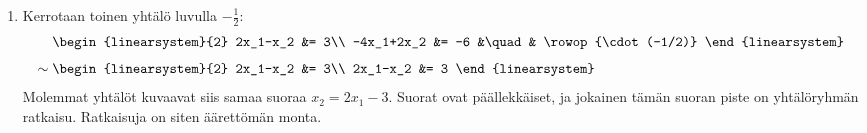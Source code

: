 \documentclass[11pt,a4paper]{amsart}
\begin{document}
\begin{solution}
  \leavevmode\par
\begin{enumerate}[label=\alph*), nosep]
  \item Kerrotaan toinen yhtälö luvulla \(-\frac12\):
    \[
      \begin{aligned}
        &
        \begin{linearsystem}{2}
          2x_1-x_2 &= 3\\
          -4x_1+2x_2 &= -6 &\quad& \rowop{\cdot(-1/2)}
        \end{linearsystem}\\[1ex]
        \sim{}&
        \begin{linearsystem}{2}
          2x_1-x_2 &= 3\\
          2x_1-x_2 &= 3
        \end{linearsystem}
      \end{aligned}
    \]
    Molemmat yhtälöt kuvaavat siis samaa suoraa \(x_2 = 2x_1 - 3\).
    Suorat ovat päällekkäiset, ja jokainen tämän suoran piste on
    yhtälöryhmän ratkaisu. Ratkaisuja on siten äärettömän monta.


\end{enumerate}
\end{solution}
\end{document}
